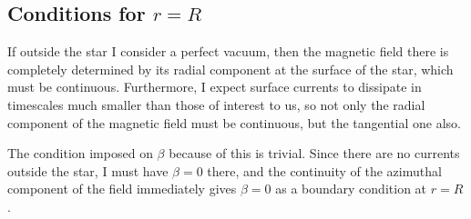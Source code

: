 \documentclass[letterpaper,10pt]{article}
\begin{document}
\subsection{Conditions for $r=R$}
If outside the star I consider a perfect vacuum, then the magnetic field there is completely determined by its radial component at the surface of the star, which must be continuous. Furthermore, I expect surface currents to dissipate in timescales much smaller than those of interest to us, so not only the radial component of the magnetic field must be continuous, but the tangential one also.

The condition imposed on $\beta$ because of this is trivial. Since there are no currents outside the star, I must have $\beta=0$ there, and the continuity of the azimuthal component of the field immediately gives $\beta=0$ as a boundary condition at $r=R$.
\end{document}
